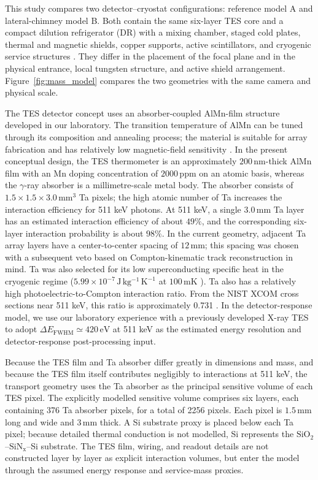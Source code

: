 \documentclass[11pt]{article}
\begin{document}
This study compares two detector--cryostat configurations: reference model A
and lateral-chimney model B. Both contain the same six-layer TES core and a compact dilution
refrigerator (DR) with a mixing chamber, staged cold plates, thermal and magnetic
shields, copper supports, active scintillators, and cryogenic service structures
\cite{Shirazi2023,Gottardi2021TESReview}. They differ in the placement of the
focal plane and in the physical entrance, local tungsten structure, and active
shield arrangement. Figure~\ref{fig:mass_model} compares the two geometries with
the same camera and physical scale.

The TES detector concept uses an absorber-coupled AlMn-film structure developed
in our laboratory. The transition temperature of AlMn can be tuned through its
composition and annealing process; the material is suitable for array fabrication
and has relatively low magnetic-field sensitivity
\cite{Xie2026AlMn,Vavagiakis2017AlMnMagnetic}. In the present conceptual design,
the TES thermometer is an approximately $200\,\mathrm{nm}$-thick AlMn film with
an Mn doping concentration of $2000\,\mathrm{ppm}$ on an atomic basis, whereas the $\gamma$-ray absorber is a
millimetre-scale metal body. The absorber consists of
$1.5\times1.5\times3.0\,\mathrm{mm^3}$ Ta pixels; the high atomic number of Ta
increases the interaction efficiency for 511 keV photons. At 511 keV, a single
$3.0\,\mathrm{mm}$ Ta layer has an estimated interaction efficiency of about
$49\%$, and the corresponding six-layer interaction probability is about
$98\%$. In the
current geometry, adjacent Ta array layers have a center-to-center spacing of
$12\,\mathrm{mm}$; this spacing was chosen with a subsequent veto based on
Compton-kinematic track reconstruction in mind. Ta was also selected for its low
superconducting specific heat in the cryogenic regime
($5.99\times10^{-7}\,\mathrm{J\,kg^{-1}\,K^{-1}}$ at $100\,\mathrm{mK}$
\cite{Yan2019TaHeatCapacity}). Ta also has a relatively
high photoelectric-to-Compton interaction ratio. From
the NIST XCOM cross sections near 511 keV, this ratio is approximately 0.731
\cite{NISTXCOM}. In the detector-response model, we use our laboratory experience
with a previously developed X-ray TES \cite{Xie2026AlMn} to adopt
$\Delta E_{\mathrm{FWHM}}\simeq420\,\mathrm{eV}$ at 511 keV as the estimated
energy resolution and detector-response post-processing input.

Because the TES film and Ta absorber differ greatly in dimensions and mass, and
because the TES film itself contributes negligibly to interactions at 511 keV,
the transport geometry uses the Ta absorber as the principal sensitive volume of
each TES pixel. The explicitly modelled sensitive volume comprises six layers,
each containing 376 Ta absorber pixels, for a total of 2256 pixels. Each pixel is
$1.5\,\mathrm{mm}$ long and wide and $3\,\mathrm{mm}$ thick. A Si substrate proxy
is placed below each Ta pixel; because detailed thermal conduction is not modelled,
Si represents the $\mathrm{SiO_2}$--$\mathrm{SiN_x}$--Si substrate. The TES film,
wiring, and readout details are not constructed layer by layer as explicit
interaction volumes, but enter the model through the assumed energy response and
service-mass proxies.
\end{document}
